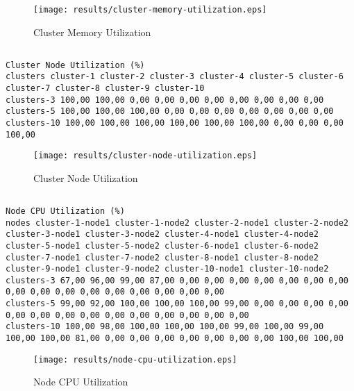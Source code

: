 \documentclass{elsart}
\begin{document}
\begin{figure}[ht]
\centering
\texttt{[image: results/cluster-memory-utilization.eps]}
\caption{Cluster Memory Utilization}\label{fig:cluster-memory-utilization.eps}
\end{figure}

\subsection{}

\begin{lstlisting}[caption={Cluster Node Utilization}]
Cluster Node Utilization (%)
clusters cluster-1 cluster-2 cluster-3 cluster-4 cluster-5 cluster-6 cluster-7 cluster-8 cluster-9 cluster-10
clusters-3 100,00 100,00 0,00 0,00 0,00 0,00 0,00 0,00 0,00 0,00
clusters-5 100,00 100,00 100,00 0,00 0,00 0,00 0,00 0,00 0,00 0,00
clusters-10 100,00 100,00 100,00 100,00 100,00 100,00 0,00 0,00 0,00 100,00
\end{lstlisting}

\begin{figure}[ht]
\centering
\texttt{[image: results/cluster-node-utilization.eps]}
\caption{Cluster Node Utilization}\label{fig:cluster-node-utilization.eps}
\end{figure}

\subsection{}

\begin{lstlisting}[caption={Node CPU Utilization}]
Node CPU Utilization (%)
nodes cluster-1-node1 cluster-1-node2 cluster-2-node1 cluster-2-node2 cluster-3-node1 cluster-3-node2 cluster-4-node1 cluster-4-node2 cluster-5-node1 cluster-5-node2 cluster-6-node1 cluster-6-node2 cluster-7-node1 cluster-7-node2 cluster-8-node1 cluster-8-node2 cluster-9-node1 cluster-9-node2 cluster-10-node1 cluster-10-node2
clusters-3 67,00 96,00 99,00 87,00 0,00 0,00 0,00 0,00 0,00 0,00 0,00 0,00 0,00 0,00 0,00 0,00 0,00 0,00 0,00 0,00
clusters-5 99,00 92,00 100,00 100,00 100,00 99,00 0,00 0,00 0,00 0,00 0,00 0,00 0,00 0,00 0,00 0,00 0,00 0,00 0,00 0,00
clusters-10 100,00 98,00 100,00 100,00 100,00 99,00 100,00 99,00 100,00 100,00 81,00 0,00 0,00 0,00 0,00 0,00 0,00 0,00 100,00 100,00
\end{lstlisting}

\begin{figure}[ht]
\centering
\texttt{[image: results/node-cpu-utilization.eps]}
\caption{Node CPU Utilization}\label{fig:node-cpu-utilization.eps}
\end{figure}
\end{document}
